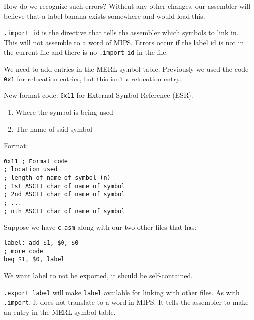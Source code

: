 \documentclass{article}
\begin{document}

How do we recognize such errors? Without any other changes, our
assembler will believe that a label banana exists somewhere and would
load this.

\texttt{.import\ id} is the directive that tells the assembler which
symbols to link in. This will not assemble to a word of MIPS. Errors
occur if the label id is not in the current file and there is no
\texttt{.import\ id} in the file.

We need to add entries in the MERL symbol table. Previously we used the
code \texttt{0x1} for relocation entries, but this isn't a relocation
entry.

New format code: \texttt{0x11} for External Symbol Reference (ESR).


\begin{enumerate}
\def\labelenumi{\arabic{enumi}.}
\item
  Where the symbol is being used
\item
  The name of said symbol
\end{enumerate}

Format:

\begin{tcolorbox}
\begin{verbatim}
0x11 ; Format code
; location used
; length of name of symbol (n)
; 1st ASCII char of name of symbol
; 2nd ASCII char of name of symbol
; ...
; nth ASCII char of name of symbol
\end{verbatim}
\end{tcolorbox}


Suppose we have \texttt{c.asm} along with our two other files that has:

\begin{tcolorbox}
\begin{verbatim}
label: add $1, $0, $0
; more code
beq $1, $0, label
\end{verbatim}
\end{tcolorbox}

We want label to not be exported, it should be self-contained.

\texttt{.export\ label} will make \texttt{label} available for linking
with other files. As with \texttt{.import}, it does not translate to a
word in MIPS. It tells the assembler to make an entry in the MERL symbol
table.
\end{document}
